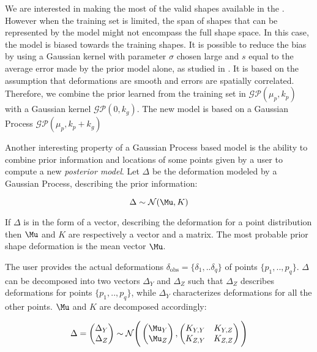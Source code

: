 We are interested in making the most of the valid shapes available in the \db*. However when the training set is limited, the span of shapes that can be represented by the model might not encompass the full shape space. In this case, the model is biased towards the training shapes. It is possible to reduce the bias by using a Gaussian kernel with parameter $\sigma$ chosen large and $s$ equal to the average error made by the prior model alone, as studied in \cite{luthi_2013_unified}. It is based on the assumption that deformations are smooth and errors are spatially correlated. Therefore, we combine the prior learned from the training set in $\mathcal{GP}(\mu_{p}, k_{p})$ with a Gaussian kernel $\mathcal{GP}(0, k_{g})$. The new model is based on a Gaussian Process $\mathcal{GP}(\mu_{p}, k_{p} + k_g)$

Another interesting property of a Gaussian Process based model is the ability to combine prior information and locations of some points given by a user to compute a new \textit{posterior model}. 
Let $\Delta$ be the deformation modeled by a Gaussian Process, describing the prior information: 

\begin{equation}
	\Delta \sim\mathcal N (\Mu, K)
\end{equation} 

If $\Delta$ is in the form of a vector, describing the deformation for a point distribution then $\Mu$ and $K$ are respectively a vector and a matrix. The most probable prior shape deformation is the mean vector $\Mu$.

The user provides the actual deformations $\delta_{\text{obs}} =  \{\delta_1,..\delta_q\}$ of points $\{p_1,..,p_q\}$. $\Delta$ can be decomposed into two vectors $\Delta_Y$ and $\Delta_Z$ such that $\Delta_Z$ describes deformations for points $\{p_1,..,p_q\}$, while $\Delta_Y$ characterizes deformations for all the other points. $\Mu$ and $K$ are decomposed accordingly: 

\begin{equation}
	\Delta = 
	\begin{pmatrix} \Delta_Y \\ \Delta_Z \end{pmatrix}
	\sim\mathcal N \Bigg(
	\begin{pmatrix} \Mu_Y \\ \Mu_Z \end{pmatrix}, 
	\begin{pmatrix} 
	K_{Y,Y} & K_{Y,Z} \\ 
	K_{Z,Y} & K_{Z,Z} 
	\end{pmatrix} 
	\Bigg)
\end{equation}

